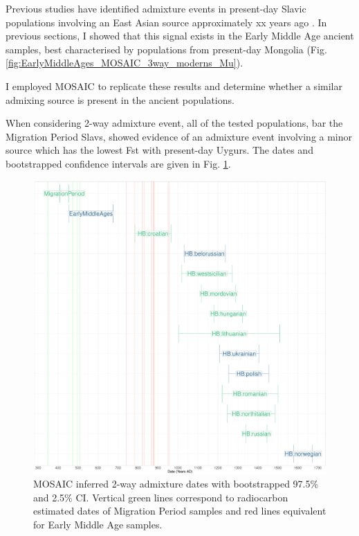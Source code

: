 Previous studies have identified admixture events in present-day Slavic populations involving an East Asian source approximately xx years ago \cite{Hellenthal2016, MOSAIC_2019}. In previous sections, I showed that this signal exists in the Early Middle Age ancient samples, best characterised by populations from present-day Mongolia (Fig. \ref{fig:EarlyMiddleAges_MOSAIC_3way_moderns_Mu}). 

I employed MOSAIC to replicate these results and determine whether a similar admixing source is present in the ancient populations. 

When considering 2-way admixture event, all of the tested populations, bar the Migration Period Slavs, showed evidence of an admixture event involving a minor source which has the lowest Fst with present-day  Uygurs. The dates and bootstrapped confidence intervals are given in Fig.  \ref{fig:MOSAIC_admixture_dates_plot}. 

\begin{figure}[htp]
    \centering
    \includegraphics[width=1.0\textwidth]{../images/chapter5/MOSAIC_admixture_dates_plot.pdf}
    \caption{MOSAIC inferred 2-way admixture dates with bootstrapped 97.5\% and 2.5\% CI. Vertical green lines correspond to radiocarbon estimated dates of Migration Period samples and red lines equivalent for Early Middle Age samples.}
    \label{fig:MOSAIC_admixture_dates_plot}
\end{figure} 

